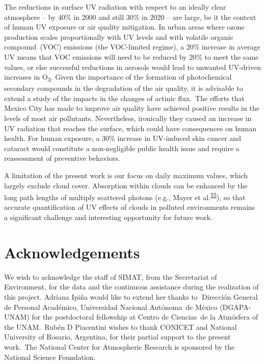 \documentclass[10pt]{article}
\begin{document}
The reductions in surface UV radiation with respect to an ideally clear
atmosphere -- by 40\% in 2000 and still 30\% in 2020 -- are large, be it
the context of human UV exposure or air quality mitigation. In urban
areas where ozone production scales proportionally with UV levels and
with volatile organic compound~(VOC) emissions (the VOC-limited regime),
a 20\% increase in average UV means that VOC emissions will need to be
reduced by 20\% to meet the same values, or else successful reductions
in aerosols would lead to unwanted UV-driven increases in
O\textsubscript{3}. Given the importance of the formation of
photochemical secondary compounds in the degradation of the air quality,
it is advisable to extend a study of the impacts in the changes of
actinic flux.~The efforts that Mexico City has made to improve air
quality have achieved positive results in the levels of most air
pollutants. Nevertheless, ironically they caused an increase in UV
radiation that reaches the surface, which could have consequences on
human health. For human exposure, a 30\% increase in UV-induced skin
cancer and cataract would constitute a non-negligible public health
issue and require a reassessment of preventive behaviors. ~

A limitation of the present work is our focus on daily maximum values,
which largely exclude cloud cover. Absorption within clouds can be
enhanced by the long path lengths of multiply scattered photons (e.g.,
Mayer et al.\textsuperscript{\hyperref[csl:55]{55}}), so that accurate quantification of UV
effects of clouds in polluted environments remains a significant
challenge and interesting opportunity for future work.~

\section*{Acknowledgements}\label{acknowledgements}

We wish to acknowledge the staff of SIMAT, from the Secretariat of
Environment, for the data and the continuous assistance during the
realization of this project. Adriana Ipiña would like to extend her
thanks to\textbf{~}Dirección General de Personal Académico, Universidad
Nacional Autónoma~de México (DGAPA-UNAM) for the postdoctoral fellowship
at Centro de Ciencias~de la Atmósfera of the UNAM.~Rubén D Piacentini
wishes to thank CONICET and National University of Rosario, Argentina,
for their partial support to the present work.~The National Center for
Atmospheric Research is sponsored by the National Science Foundation.
\end{document}

